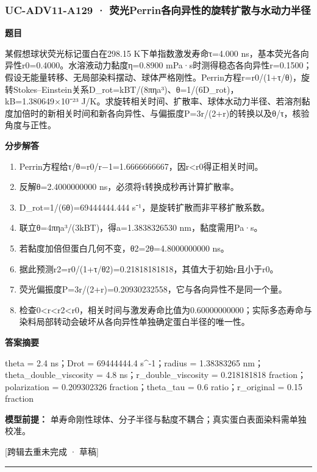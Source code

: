 \documentclass[UTF8,11pt,a4paper]{ctexart}
\begin{document}
\subsubsection*{UC-ADV11-A129 · 荧光Perrin各向异性的旋转扩散与水动力半径}
\noindent\textbf{题目}\par
某假想球状荧光标记蛋白在298.15 K下单指数激发寿命τ=4.000 ns，基本荧光各向异性r0=0.4000。水溶液动力黏度η=0.8900 mPa·s时测得稳态各向异性r=0.1500；假设无能量转移、无局部染料摆动、球体严格刚性。Perrin方程r=r0/(1+τ/θ)，旋转Stokes–Einstein关系D\_rot=kBT/(8πηa³)、θ=1/(6D\_rot)，kB=1.380649×10⁻²³ J/K。求旋转相关时间、扩散率、球体水动力半径、若溶剂黏度加倍时的新相关时间和新各向异性、与偏振度P=3r/(2+r)的转换以及θ/τ，核验角度与正性。\par
\medskip\noindent\textbf{分步解答}
\begin{enumerate}
\item Perrin方程给τ/θ=r0/r−1=1.6666666667，因r<r0得正相关时间。
\item 反解θ=2.4000000000 ns，必须将τ转换成秒再计算扩散率。
\item D\_rot=1/(6θ)=69444444.444 s⁻¹，是旋转扩散而非平移扩散系数。
\item 联立θ=4πηa³/(3kBT)，得a=1.3838326530 nm，黏度需用Pa·s。
\item 若黏度加倍但蛋白几何不变，θ2=2θ=4.8000000000 ns。
\item 据此预测r2=r0/(1+τ/θ2)=0.21818181818，其值大于初始r且小于r0。
\item 荧光偏振度P=3r/(2+r)=0.20930232558，它与各向异性不是同一个量。
\item 检查0<r<r2<r0，相关时间与激发寿命比值为0.60000000000；实际多态寿命与染料局部转动会破坏从各向异性单独确定蛋白半径的唯一性。
\end{enumerate}
\noindent\textbf{答案摘要}\par
theta = 2.4 ns；Drot = 69444444.4 s\textasciicircum{}-1；radius = 1.38383265 nm；theta\_double\_viscosity = 4.8 ns；r\_double\_viscosity = 0.218181818 fraction；polarization = 0.209302326 fraction；theta\_tau = 0.6 ratio；r\_original = 0.15 fraction\par
\noindent\textbf{模型前提：}
单寿命刚性球体、分子半径与黏度不耦合；真实蛋白表面染料需单独校准。\par
\noindent\textcolor{red!65!black}{[跨辑去重未完成 · 草稿]} \par
\medskip\hrule\medskip
{}
\end{document}
